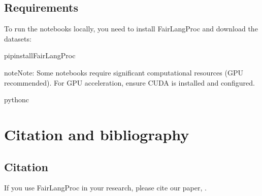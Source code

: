 \documentclass[letterpaper,10pt,english]{sphinxmanual}
\begin{document}
\section{Requirements}
\label{\detokenize{tutorials:requirements}}
\sphinxAtStartPar
To run the notebooks locally, you need to install FairLangProc and download the datasets:

\begin{sphinxVerbatim}[commandchars=\\\{\}]
pipinstallFairLangProc
\end{sphinxVerbatim}

\begin{sphinxadmonition}{note}{Note:}
\sphinxAtStartPar
Some notebooks require significant computational resources (GPU recommended).
For GPU acceleration, ensure CUDA is installed and configured.

\begin{sphinxVerbatim}[commandchars=\\\{\}]
python\PYGZhy{}c
\end{sphinxVerbatim}
\end{sphinxadmonition}

\sphinxstepscope


\chapter{Citation and bibliography}
\label{\detokenize{citation:citation-and-bibliography}}\label{\detokenize{citation::doc}}

\section{Citation}
\label{\detokenize{citation:citation}}
\sphinxAtStartPar
If you use FairLangProc in your research, please cite our paper, .
\end{document}
